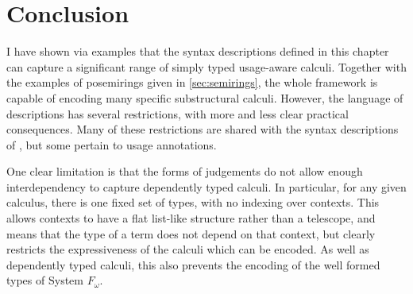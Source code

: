%
%
%

\section{Conclusion}

I have shown via examples that the syntax descriptions defined in this chapter
can capture a significant range of simply typed usage-aware calculi.
Together with the examples of posemirings given in \cref{sec:semirings}, the
whole framework is capable of encoding many specific substructural calculi.
However, the language of descriptions has several restrictions, with more and
less clear practical consequences.
Many of these restrictions are shared with the syntax descriptions of
\citet{AACMM21}, but some pertain to usage annotations.

One clear limitation is that the forms of judgements do not allow enough
interdependency to capture dependently typed calculi.
In particular, for any given calculus, there is one fixed set of types, with no
indexing over contexts.
This allows contexts to have a flat list-like structure rather than a telescope,
and means that the type of a term does not depend on that context, but clearly
restricts the expressiveness of the calculi which can be encoded.
As well as dependently typed calculi, this also prevents the encoding of the
well formed types of System $F_\omega$.

